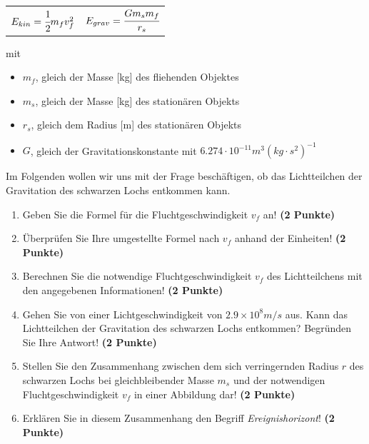 \documentclass[a4paper, 9pt]{scrartcl}\usepackage[]{graphicx}\usepackage[]{xcolor}
\begin{document}
\begin{center}
  \begin{tabular}{cc}
    $E_{kin} = \cfrac{1}{2}m_fv_f^2$ & $E_{grav} = \cfrac{Gm_sm_f}{r_s}$\\
  \end{tabular}
\end{center}

mit

\begin{itemize}[noitemsep]
\item $m_f$, gleich der Masse [kg] des fliehenden Objektes
\item $m_s$, gleich der Masse [kg] des station{\"a}ren Objekts
\item $r_s$, gleich dem Radius [m] des station{\"a}ren Objekts  
\item $G$, gleich der Gravitationskonstante mit $6.274 \cdot 10^{-11}
  m^3(kg \cdot s^2)^{-1}$ 
\end{itemize}

Im Folgenden wollen wir uns mit der Frage besch{\"a}ftigen, ob das
Lichtteilchen der Gravitation des schwarzen Lochs entkommen kann.

\begin{enumerate}
\item Geben Sie die Formel f{\"u}r die Fluchtgeschwindigkeit $v_f$ an! 
  \textbf{(2 Punkte)}
\item {\"U}berpr{\"u}fen Sie Ihre umgestellte Formel nach $v_f$ anhand der Einheiten!
  \textbf{(2 Punkte)} 
\item Berechnen Sie die notwendige Fluchtgeschwindigkeit $v_f$ des
  Lichtteilchens mit den angegebenen Informationen! \textbf{(2 Punkte)}
\item Gehen Sie von einer Lichtgeschwindigkeit von $\ensuremath{2.9\times 10^{8}}m/s$
  aus. Kann das Lichtteilchen der Gravitation des schwarzen Lochs
  entkommen? Begr{\"u}nden Sie Ihre Antwort! \textbf{(2 Punkte)}
\item Stellen Sie den Zusammenhang zwischen dem sich verringernden Radius
  $r$ des schwarzen Lochs bei gleichbleibender Masse $m_s$
  und der notwendigen Fluchtgeschwindigkeit $v_f$ in einer Abbildung dar!
  \textbf{(2 Punkte)}
\item Erkl{\"a}ren Sie in diesem Zusammenhang den Begriff
  \textit{Ereignishorizont}! \textbf{(2 Punkte)} 
\end{enumerate}

 
\clearpage
\end{document}

